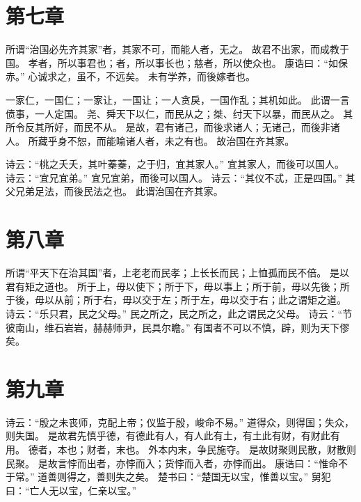 \documentclass[twoside,openany]{book}
\begin{document}
\begin{pinyinscope}
\chapter{第七章}\label{ch07}
所谓“治国必先齐其家”者，其家不可，而能人者，无之。
故君不出家，而成教于国。
孝者，所以事君也；者，所以事长也；慈者，所以使众也。
康诰曰：“如保赤。”
心诚求之，虽不，不远矣。
未有学养，而後嫁者也。

一家仁，一国仁；一家让，一国让；一人贪戾，一国作乱；其机如此。
此谓一言偾事，一人定国。
尧、舜天下以仁，而民从之；桀、纣天下以暴，而民从之。
其所令反其所好，而民不从。
是故，君有诸己，而後求诸人；无诸己，而後非诸人。
所藏乎身不恕，而能喻诸人者，未之有也。
故治国在齐其家。

诗云：“桃之夭夭，其叶蓁蓁，之于归，宜其家人。”
宜其家人，而後可以国人。
诗云：“宜兄宜弟。”
宜兄宜弟，而後可以国人。
诗云：“其仪不忒，正是四国。”
其父兄弟足法，而後民法之也。
此谓治国在齐其家。

%

\chapter{第八章}\label{ch08}
所谓“平天下在治其国”者，上老老而民孝；上长长而民；上恤孤而民不倍。
是以君有矩之道也。
所于上，毋以使下；所于下，毋以事上；所于前，毋以先後；所于後，毋以从前；所于右，毋以交于左；所于左，毋以交于右；此之谓矩之道。
诗云：“乐只君，民之父母。”
民之所之，民之所之，此之谓民之父母。
诗云：“节彼南山，维石岩岩，赫赫师尹，民具尔瞻。”
有国者不可以不慎，辟，则为天下僇矣。

\chapter{第九章}\label{ch09}
诗云：“殷之未丧师，克配上帝；仪监于殷，峻命不易。”
道得众，则得国；失众，则失国。
是故君先慎乎德，有德此有人，有人此有土，有土此有财，有财此有用。
德者，本也；财者，末也。
外本内末，争民施夺。
是故财聚则民散，财散则民聚。
是故言悖而出者，亦悖而入；货悖而入者，亦悖而出。
康诰曰：“惟命不于常。”
道善则得之，善则失之矣。
楚书曰：“楚国无以宝，惟善以宝。”
舅犯曰：“亡人无以宝，仁亲以宝。”


\end{pinyinscope}
\end{document}
